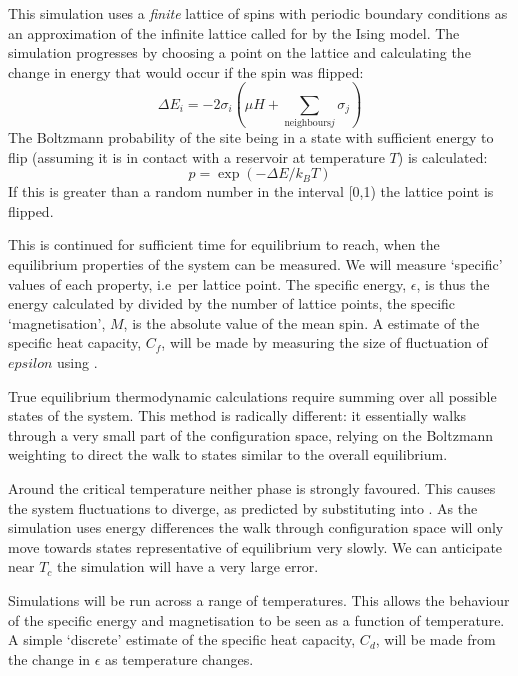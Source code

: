 \documentclass[12pt,a4paper,english]{article}
\begin{document}
This simulation uses a \emph{finite} lattice of spins with periodic boundary conditions as an approximation of the infinite lattice called for by the Ising model.  The simulation progresses by choosing a point on the lattice and calculating the change in energy that would occur if the spin was flipped:
\begin{equation}
\Delta E_i = - 2 \sigma_i \left( \mu H + \sum_{\mathrm{neighbours }j} \sigma_j \right)
\end{equation}
The Boltzmann probability of the site being in a state with sufficient energy to flip (assuming it is in contact with a reservoir at temperature $T$) is calculated:
\begin{equation}
p = \exp\left(-\Delta E / k_B T \right)
\end{equation}
If this is greater than a random number in the interval [0,1) the lattice point is flipped.

This is continued for sufficient time for equilibrium to reach, when the equilibrium properties of the system can be measured.  We will measure `specific' values of each property, i.e\ per lattice point.  The specific energy, $\epsilon$, is thus the energy calculated by  divided by the number of lattice points, the specific `magnetisation', $M$, is the absolute value of the mean spin. A estimate of the specific heat capacity, $C_f$, will be made by measuring the size of fluctuation of $epsilon$ using .

True equilibrium thermodynamic calculations require summing over all possible states of the system. This method is radically different: it essentially walks through a very small part of the configuration space, relying on the Boltzmann weighting to direct the walk to states similar to the overall equilibrium.

Around the critical temperature neither phase is strongly favoured.  This causes the system fluctuations to diverge, as predicted by substituting  into .  As the simulation uses energy differences the walk through configuration space will only move towards states representative of equilibrium very slowly.  We can anticipate near $T_c$ the simulation will have a very large error.

Simulations will be run across a range of temperatures.  This allows the behaviour of the specific energy and magnetisation to be seen as a function of temperature.  A simple `discrete' estimate of the specific heat capacity, $C_d$, will be made from the change in $\epsilon$ as temperature changes.
\end{document}
